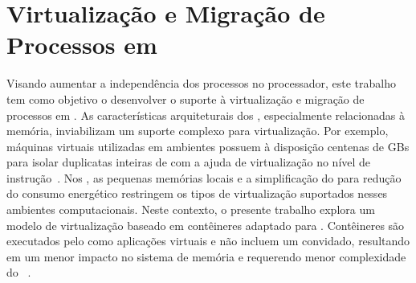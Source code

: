 \glsresetall

\chapter{Virtualização e Migração de Processos em \Lws}
\label{chap.dev.virtualizacao}

Visando aumentar a independência dos processos no processador, este trabalho tem como objetivo o desenvolver o suporte à virtualização e migração de processos em \lws. As características arquiteturais dos \lws, especialmente relacionadas à memória, inviabilizam um suporte complexo para virtualização. Por exemplo, máquinas virtuais utilizadas em ambientes \cloud possuem à disposição centenas de GBs para isolar duplicatas inteiras de \oss com a ajuda de virtualização no nível de instrução~\cite{sharma2016containers}. Nos \lws, as pequenas memórias locais e a simplificação do \hardware para redução do consumo energético restringem os tipos de virtualização suportados nesses ambientes computacionais.
%
Neste contexto, o presente trabalho explora um modelo de virtualização baseado em contêineres adaptado para \lws. Contêineres são executados pelo \os como aplicações virtuais e não incluem um \os convidado, resultando em um menor impacto no sistema de memória e requerendo menor complexidade do \hardware~\cite{thalheim2018cntr, sharma2016containers}.


